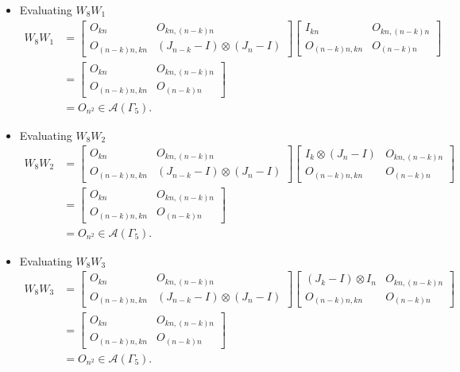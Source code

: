 \begin{itemize}
\item Evaluating $W_{8}W_{1}$
\begin{align*}
    W_8W_1
    &= \begin{bmatrix}
        O_{kn} & O_{kn, (n-k)n} \\
        O_{(n-k)n,kn} & (J_{n-k} - I) \otimes (J_n-I)
    \end{bmatrix}
    \begin{bmatrix}
        I_{kn} & O_{kn, (n-k)n} \\
        O_{(n-k)n,kn} & O_{(n-k)n}
    \end{bmatrix}\\
    &= \begin{bmatrix}
        O_{kn} & O_{kn, (n-k)n} \\
        O_{(n-k)n,kn} & O_{(n-k)n}
    \end{bmatrix}\\
    &= O_{n^2} \in\mathcal{A}(\Gamma_5).
\end{align*}

\item Evaluating $W_{8}W_{2}$
\begin{align*}
    W_8W_2
    &= \begin{bmatrix}
        O_{kn} & O_{kn, (n-k)n} \\
        O_{(n-k)n,kn} & (J_{n-k} - I) \otimes (J_n-I)
    \end{bmatrix}
    \begin{bmatrix}
        I_{k}\otimes (J_n-I) & O_{kn, (n-k)n} \\
        O_{(n-k)n,kn} & O_{(n-k)n}
    \end{bmatrix}\\
    &= \begin{bmatrix}
        O_{kn} & O_{kn, (n-k)n} \\
        O_{(n-k)n,kn} & O_{(n-k)n}
    \end{bmatrix}\\
    &= O_{n^2} \in\mathcal{A}(\Gamma_5).
\end{align*}

\item Evaluating $W_{8}W_{3}$
\begin{align*}
    W_8W_3
    &= \begin{bmatrix}
        O_{kn} & O_{kn, (n-k)n} \\
        O_{(n-k)n,kn} & (J_{n-k} - I) \otimes (J_n-I)
    \end{bmatrix}
    \begin{bmatrix}
        (J_k-I)\otimes I_n & O_{kn, (n-k)n} \\
        O_{(n-k)n,kn} & O_{(n-k)n}
    \end{bmatrix}\\
    &= \begin{bmatrix}
        O_{kn} & O_{kn, (n-k)n} \\
        O_{(n-k)n,kn} & O_{(n-k)n}
    \end{bmatrix}\\
    &= O_{n^2} \in\mathcal{A}(\Gamma_5).
\end{align*}


\end{itemize}
